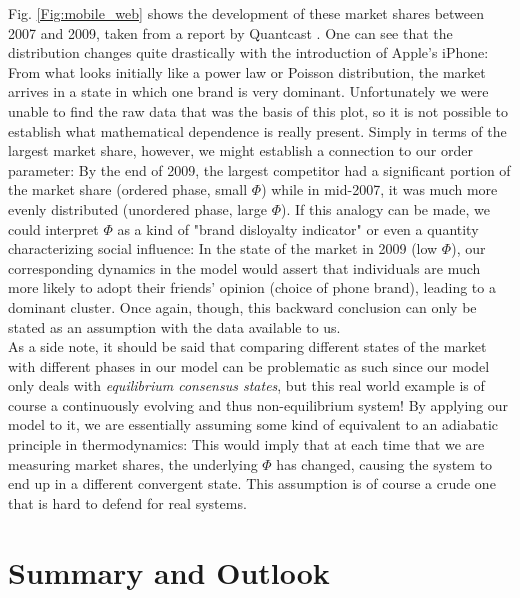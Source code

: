 \documentclass[11pt]{article}
\begin{document}
Fig. \ref{Fig:mobile_web} shows the development of these market shares between 2007 and 2009, taken from a report by Quantcast \cite{quantcast}. One can see that the distribution changes quite drastically with the introduction of Apple's iPhone: From what looks initially like a power law or Poisson distribution, the market arrives in a state in which one brand is very dominant. Unfortunately we were unable to find the raw data that was the basis of this plot, so it is not possible to establish what mathematical dependence is really present. Simply in terms of the largest market share, however, we might establish a connection to our order parameter: By the end of 2009, the largest competitor had a significant portion of the market share (ordered phase, small $\Phi$) while in mid-2007, it was much more evenly distributed (unordered phase, large $\Phi$). If this analogy can be made, we could interpret $\Phi$ as a kind of "brand disloyalty indicator" or even a quantity characterizing social influence: In the state of the market in 2009 (low $\Phi$), our corresponding dynamics in the model would assert that individuals are much more likely to adopt their friends' opinion (choice of phone brand), leading to a dominant cluster. Once again, though, this backward conclusion can only be stated as an assumption with the data available to us.\\

As a side note, it should be said that comparing different states of the market with different phases in our model can be problematic as such since our model only deals with \emph{equilibrium consensus states}, but this real world example is of course a continuously evolving and thus non-equilibrium system! By applying our model to it, we are essentially assuming some kind of equivalent to an adiabatic principle in thermodynamics: This would imply that at each time that we are measuring market shares, the underlying $\Phi$ has changed, causing the system to end up in a different convergent state. This assumption is of course a crude one that is hard to defend for real systems.



\section{Summary and Outlook}
\label{Sec:summary}

\end{document}
